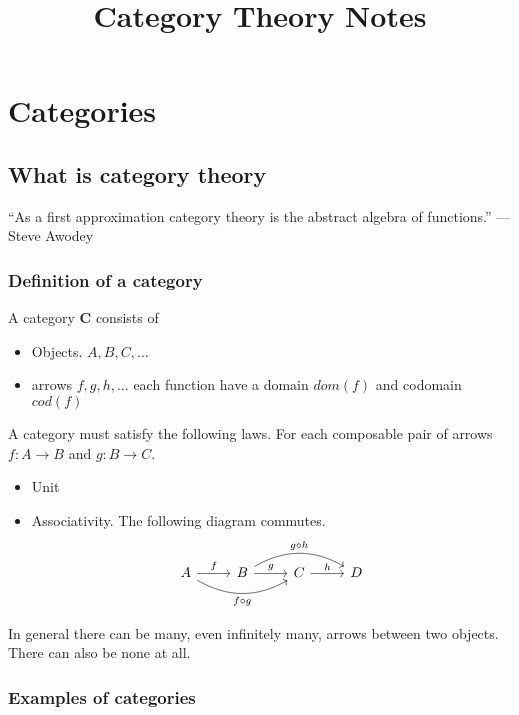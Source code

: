 \documentclass{book}
\title{Category Theory Notes}
\author{}
\theoremstyle{definition}
\begin{document}
\maketitle

\tableofcontents
\newpage

\chapter{Categories}

\section{What is category theory}

``As a first approximation category theory is the abstract algebra of
functions.'' --- Steve Awodey

\subsection{Definition of a category}

A category $\mathbf{C}$ consists of
\begin{itemize}
\item Objects. $A, B, C, \dots$
  \item arrows $f, g, h, \dots$ each function have a domain $dom(f)$ and
    codomain $cod(f)$
\end{itemize}

A category must satisfy the following laws. For each composable pair of arrows
$f : A \to B$ and $g : B \to C$.
\begin{itemize}
  \item Unit
  \item Associativity.
    The following diagram commutes.
    \[
      \begin{tikzcd}
        A \ar[rr, bend right, "f \circ g"'] \ar[r, "f"] & \ar[rr, bend left, "g \circ h"] B \ar[r, "g"] & C \ar[r, "h"] & D
      \end{tikzcd}
    \]
\end{itemize}

In general there can be many, even infinitely many, arrows between two objects.
There can also be none at all.

\subsection{Examples of categories}
\end{document}
